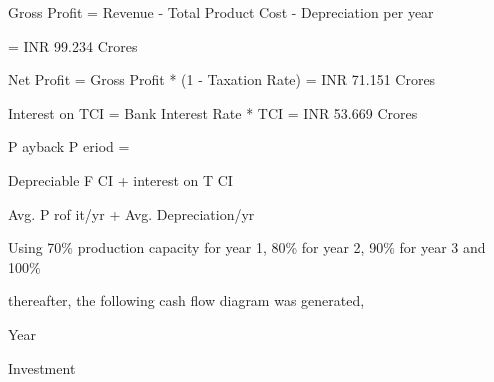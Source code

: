 \documentclass[a4paper,portrait,12pt]{article}
\begin{document}
\begin{flushleft}
Gross Profit = Revenue - Total Product Cost - Depreciation per year
\end{flushleft}


\begin{flushleft}
= INR 99.234 Crores
\end{flushleft}


\begin{flushleft}
Net Profit = Gross Profit * (1 - Taxation Rate) = INR 71.151 Crores
\end{flushleft}


\begin{flushleft}
Interest on TCI = Bank Interest Rate * TCI = INR 53.669 Crores
\end{flushleft}


\begin{flushleft}
P ayback P eriod =
\end{flushleft}





\begin{flushleft}
Depreciable F CI + interest on T CI
\end{flushleft}


\begin{flushleft}
Avg. P rof it/yr + Avg. Depreciation/yr
\end{flushleft}





\begin{flushleft}
Using 70\% production capacity for year 1, 80\% for year 2, 90\% for year 3 and 100\%
\end{flushleft}


\begin{flushleft}
thereafter, the following cash flow diagram was generated,
\end{flushleft}





\begin{flushleft}
Year
\end{flushleft}





\begin{flushleft}
Investment
\end{flushleft}
\end{document}

